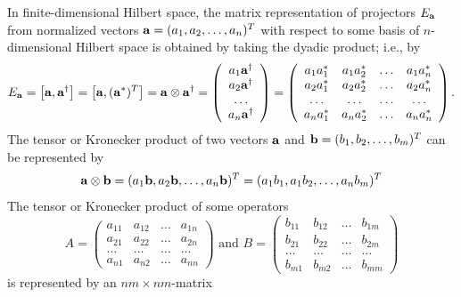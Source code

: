 \documentclass[fleqn,twoside]{article}      %
\begin{document}
In finite-dimensional Hilbert space, the matrix representation of projectors $E_{\bf a}$
from normalized vectors ${\bf a}=(a_1,a_2,\ldots ,a_n)^T$ with respect to some basis of $n$-dimensional Hilbert space
is obtained by taking the dyadic product; i.e., by
\begin{equation}
E_{\bf a}= \left[{\bf a},{\bf a}^\dagger\right]=\left[{\bf a},({\bf a}^\ast)^T\right]=
{\bf a}\otimes {\bf a}^\dagger =
\left(
\begin{array}{cccccccccc}
a_1{\bf a}^\dagger \\
a_2{\bf a}^\dagger \\
\ldots  \\
a_n{\bf a}^\dagger
\end{array}
\right)
=
\left(
\begin{array}{cccccccccc}
a_1a_1^\ast & a_1a_2^\ast & \ldots & a_1a_n^\ast \\
a_2a_1^\ast & a_2a_2^\ast & \ldots & a_2a_n^\ast \\
\ldots & \ldots & \ldots & \ldots \\
a_na_1^\ast & a_na_2^\ast & \ldots & a_na_n^\ast
\end{array}
\right)
.
\end{equation}
The tensor or Kronecker product of two vectors ${\bf a}$ and ${\bf b} =(b_1,b_2,\ldots ,b_m)^T$ can be represented by
\begin{equation}
{\bf a} \otimes {\bf b} = (a_1{\bf b},a_2{\bf b},\ldots ,a_n{\bf b})^T = (a_1b_1,a_1b_2,\ldots ,a_nb_m)^T
\end{equation}
The tensor or Kronecker product of some operators
\begin{equation}
A=
\left(
\begin{array}{cccccccccc}
a_{11} & a_{12} & \ldots & a_{1n} \\
a_{21} & a_{22} & \ldots & a_{2n} \\
\ldots & \ldots & \ldots & \ldots \\
a_{n1} & a_{n2} & \ldots & a_{nn}
\end{array}
\right)
\text{ and  }B=
\left(
\begin{array}{cccccccccc}
b_{11} & b_{12} & \ldots & b_{1m} \\
b_{21} & b_{22} & \ldots & b_{2m} \\
\ldots & \ldots & \ldots & \ldots \\
b_{m1} & b_{m2} & \ldots & b_{mm}
\end{array}
\right)
\end{equation}
is represented by an $nm\times nm$-matrix
\end{document}
